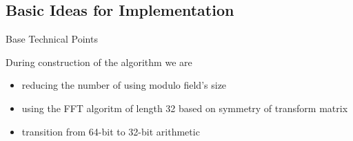 \subsection{Basic Ideas for Implementation}

\begin{frame}{Base  Technical Points}

 During construction of the algorithm we are
  \begin{itemize}

\item
 reducing the number of using  modulo field's size

\pause
\item
 using the FFT algoritm of length 32 based on symmetry of transform matrix
\pause
\item
transition from 64-bit to 32-bit arithmetic

  \end{itemize}

\end{frame}


